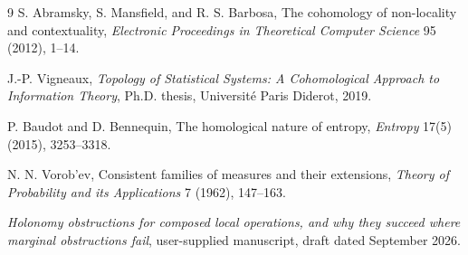 \documentclass[11pt]{article}
\begin{document}
\begin{thebibliography}{9}
S. Abramsky, S. Mansfield, and R. S. Barbosa,
\newblock The cohomology of non-locality and contextuality,
\newblock \emph{Electronic Proceedings in Theoretical Computer Science} 95 (2012), 1--14.

J.-P. Vigneaux,
\newblock \emph{Topology of Statistical Systems: A Cohomological Approach to Information Theory},
\newblock Ph.D. thesis, Universit\'e Paris Diderot, 2019.

P. Baudot and D. Bennequin,
\newblock The homological nature of entropy,
\newblock \emph{Entropy} 17(5) (2015), 3253--3318.

N. N. Vorob'ev,
\newblock Consistent families of measures and their extensions,
\newblock \emph{Theory of Probability and its Applications} 7 (1962), 147--163.

\newblock \emph{Holonomy obstructions for composed local operations, and why they succeed where marginal obstructions fail},
\newblock user-supplied manuscript, draft dated September 2026.
\end{thebibliography}
\end{document}
